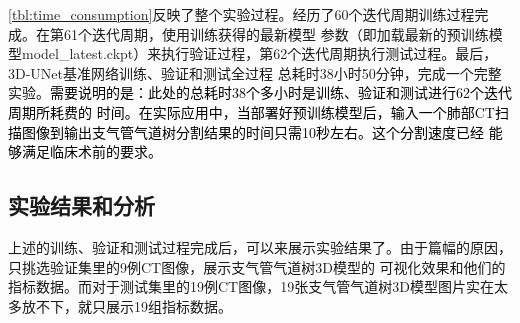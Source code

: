 \autoref{tbl:time_consumption}反映了整个实验过程。经历了60个迭代周期训练过程完成。在第61个迭代周期，使用训练获得的最新模型
参数（即加载最新的预训练模型model\_latest.ckpt）来执行验证过程，第62个迭代周期执行测试过程。最后，3D-UNet基准网络训练、验证和测试全过程
总耗时38小时50分钟，完成一个完整实验。\textcolor{black}{需要说明的是：此处的总耗时38个多小时是训练、验证和测试进行62个迭代周期所耗费的
时间。在实际应用中，当部署好预训练模型后，输入一个肺部CT扫描图像到输出支气管气道树分割结果的时间只需10秒左右。这个分割速度已经
能够满足临床术前的要求。}

\subsection{实验结果和分析}\label{subsec:experiment_results}
上述的训练、验证和测试过程完成后，可以来展示实验结果了。由于篇幅的原因，只挑选验证集里的9例CT图像，展示支气管气道树3D模型的
可视化效果和他们的指标数据。而对于测试集里的19例CT图像，19张支气管气道树3D模型图片实在太多放不下，就只展示19组指标数据。

